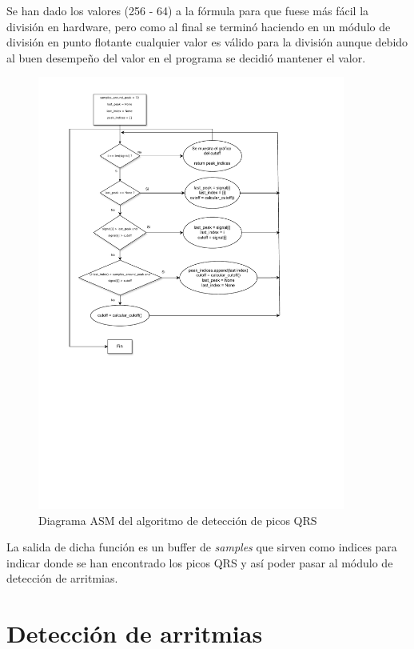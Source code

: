 Se han dado los valores (256 - 64) a la fórmula para que fuese más fácil la división en hardware, pero como al final 
se terminó haciendo en un módulo de división en punto flotante cualquier valor es válido para la división aunque debido 
al buen desempeño del valor en el programa se decidió mantener el valor.

\begin{figure}[h!]
	\centering
    \includegraphics[width=0.9\textwidth]{./Images/img_algoritmo/Diagramapicos.pdf}
    \caption{Diagrama ASM del algoritmo de detección de picos QRS}
    \label{fig:diagramapicos}
\end{figure} 

\FloatBarrier
La salida de dicha función es un buffer de \textit{samples} que sirven como indices para indicar donde se han encontrado
los picos QRS y así poder pasar al módulo de detección de arritmias.

\section{Detección de arritmias}

